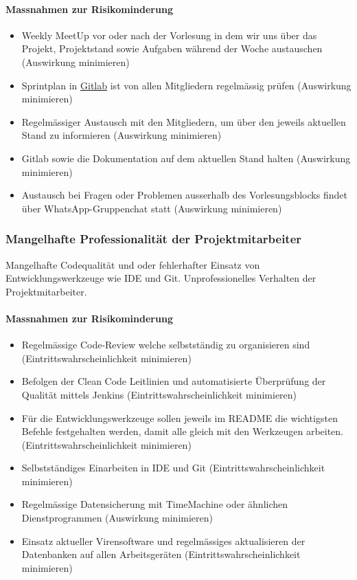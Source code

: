 \documentclass[11pt]{article}
\begin{document}
\paragraph{Massnahmen zur Risikominderung}
\begin{itemize}
\item Weekly MeetUp vor oder nach der Vorlesung in dem wir uns über das Projekt, Projektstand sowie Aufgaben während der Woche austauschen (Auswirkung minimieren)
\item Sprintplan in \href{https://gitlab.enterpriselab.ch/vsk-20fs01/g04/g04-project/boards}{Gitlab} ist von allen Mitgliedern regelmässig prüfen (Auswirkung minimieren)
\item Regelmässiger Austausch mit den Mitgliedern, um über den jeweils aktuellen Stand zu informieren (Auswirkung minimieren)
\item Gitlab sowie die Dokumentation auf dem aktuellen Stand halten (Auswirkung minimieren)
\item Austausch bei Fragen oder Problemen ausserhalb des Vorlesungsblocks findet über WhatsApp-Gruppenchat statt (Auswirkung minimieren)
\end{itemize}
\subsubsection{Mangelhafte Professionalität der Projektmitarbeiter}
Mangelhafte Codequalität und oder fehlerhafter Einsatz von Entwicklungswerkzeuge wie IDE und Git. Unprofessionelles Verhalten der Projektmitarbeiter.
\paragraph{Massnahmen zur Risikominderung}
\begin{itemize}
\item Regelmässige Code-Review welche selbstständig zu organisieren sind (Eintrittswahrscheinlichkeit minimieren)
\item Befolgen der Clean Code Leitlinien und automatisierte Überprüfung der Qualität mittels Jenkins (Eintrittswahrscheinlichkeit minimieren)
\item Für die Entwicklungswerkzeuge sollen jeweils im README die wichtigsten Befehle festgehalten werden, damit alle gleich mit den Werkzeugen arbeiten.  (Eintrittswahrscheinlichkeit minimieren)
\item Selbstständiges Einarbeiten in IDE und Git (Eintrittswahrscheinlichkeit minimieren)
\item Regelmässige Datensicherung mit TimeMachine oder ähnlichen Dienstprogrammen (Auswirkung minimieren)
\item Einsatz aktueller Virensoftware und regelmässiges aktualisieren der Datenbanken auf allen Arbeitsgeräten (Eintrittswahrscheinlichkeit minimieren)
\end{itemize}
\end{document}
